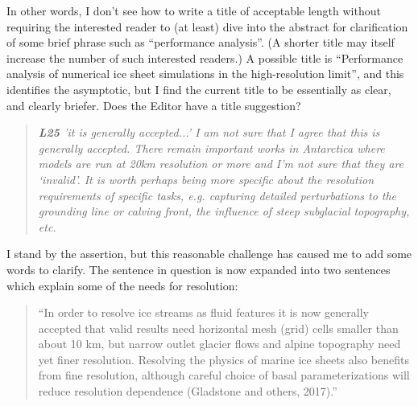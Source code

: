 \documentclass[letterpaper,final,12pt,reqno]{amsart}
\newenvironment{review}%
{\bigskip \par \begin{quote} \selectfont \sl}%
{\end{quote}}
\begin{document}
In other words, I don't see how to write a title of acceptable length without requiring the interested reader to (at least) dive into the abstract for clarification of some brief phrase such as ``performance analysis''.  (A shorter title may itself increase the number of such interested readers.)  A possible title is ``Performance analysis of numerical ice sheet simulations in the high-resolution limit'', and this identifies the asymptotic, but I find the current title to be essentially as clear, and clearly briefer.  Does the Editor have a title suggestion?

\begin{review}
\textbf{L25} 'it is generally accepted...'  I am not sure that I agree that this is generally accepted.  There remain important works in Antarctica where models are run at 20km resolution or more and I’m not sure that they are ‘invalid’.  It is worth perhaps being more specific about the resolution requirements of specific tasks, e.g. capturing detailed perturbations to the grounding line or calving front, the influence of steep subglacial topography, etc.
\end{review}

\noindent I stand by the assertion, but this reasonable challenge has caused me to add some words to clarify.  The sentence in question is now expanded into two sentences which explain some of the needs for resolution:

\begin{quote}``In order to resolve ice streams as fluid features it is now generally accepted that valid results need horizontal mesh (grid) cells smaller than about 10 km, but narrow outlet glacier flows and alpine topography need yet finer resolution.  Resolving the physics of marine ice sheets also benefits from fine resolution, although careful choice of basal parameterizations will reduce resolution dependence (Gladstone and others, 2017).''\end{quote}
\end{document}
